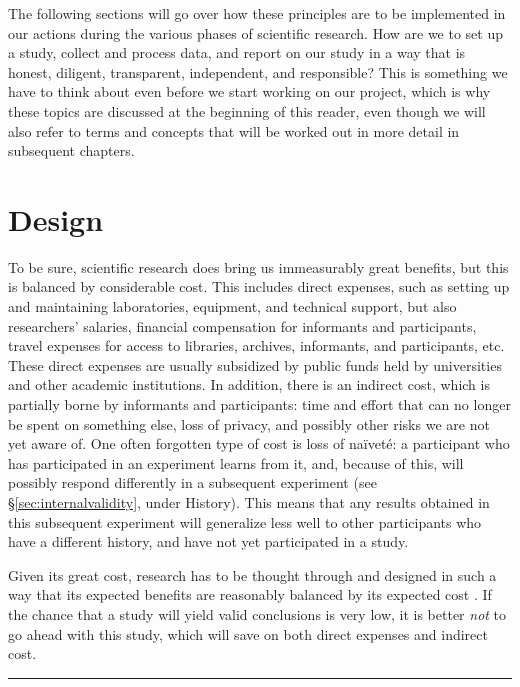 \documentclass[
]{book}
\begin{document}
The following sections will go over how these principles are to be implemented in our actions during the various phases of scientific research. How are we to set up a study, collect and process data, and report on our study in a way that is honest, diligent, transparent, independent, and responsible? This is something we have to think about even before we start working on our project, which is why these topics are discussed at the beginning of this reader, even though we will also refer to terms and concepts that will be worked out in more detail in subsequent chapters.

\hypertarget{sec:design}{%
\section{Design}\label{sec:design}}

To be sure, scientific research does bring us immeasurably great benefits, but this is balanced by considerable cost. This includes direct expenses, such as setting up and maintaining laboratories, equipment, and technical support, but also researchers' salaries, financial compensation for informants and participants, travel expenses for access to libraries, archives, informants, and participants, etc. These direct expenses are usually subsidized by public funds held by universities and other academic institutions. In addition, there is an indirect cost, which is partially borne by informants and participants: time and effort that can no longer be spent on something else, loss of privacy, and possibly other risks we are not yet aware of. One often forgotten type of cost is loss of naïveté: a participant who has participated in an experiment learns from it, and, because of this, will possibly respond differently in a subsequent experiment (see §\ref{sec:internalvalidity}, under History). This means that any results obtained in this subsequent experiment will generalize less well to other participants who have a different history, and have not yet participated in a study.

Given its great cost, research has to be thought through and designed in such a way that its expected benefits are reasonably balanced by its expected cost \citep[Ch.3]{Rose08}. If the chance that a study will yield valid conclusions is very low, it is better \emph{not} to go ahead with this study, which will save on both direct expenses and indirect cost.

\begin{center}\rule{0.5\linewidth}{0.5pt}\end{center}
\end{document}
